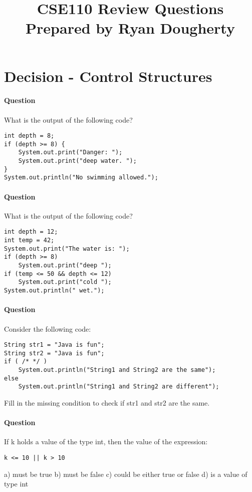 \documentclass{article}
\date{}
\begin{document}
\title{\textbf{CSE110 Review Questions \\
Prepared by Ryan Dougherty}}
\maketitle

\section*{Decision - Control Structures}


\setcounter{question_num}{1}
\paragraph{Question }
What is the output of the following code?
\begin{lstlisting}
int depth = 8;
if (depth >= 8) {
	System.out.print("Danger: ");
	System.out.print("deep water. ");
}
System.out.println("No swimming allowed.");
\end{lstlisting}


\addtocounter{question_num}{1}
\paragraph{Question }
What is the output of the following code?
\begin{lstlisting}
int depth = 12;
int temp = 42;
System.out.print("The water is: ");
if (depth >= 8)
	System.out.print("deep ");
if (temp <= 50 && depth <= 12)
	System.out.print("cold ");
System.out.println(" wet.");
\end{lstlisting}

\addtocounter{question_num}{1}
\paragraph{Question }
Consider the following code:
\begin{lstlisting}
String str1 = "Java is fun";
String str2 = "Java is fun";
if ( /* */ )
	System.out.println("String1 and String2 are the same");
else
	System.out.println("String1 and String2 are different");
\end{lstlisting}
Fill in the missing condition to check if str1 and str2 are the same.

\addtocounter{question_num}{1}
\paragraph{Question }
If k holds a value of the type int, then the value of the expression:
\begin{lstlisting}
k <= 10 || k > 10
\end{lstlisting}
a) must be true
\newline b) must be false
\newline c) could be either true or false
\newline d) is a value of type int
\end{document}
